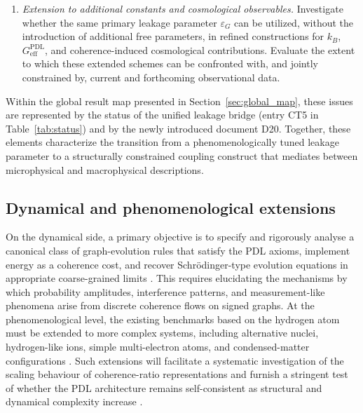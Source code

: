\documentclass[11pt,a4paper]{article}
\newcommand{\PDL}{\mathrm{PDL}}
\begin{document}
\begin{enumerate}[label=(\roman*), leftmargin=*]
  In addition, investigate whether alternative PDL-compatible architectures exist that simultaneously reproduce $G$ and $\alpha$ while violating this bridge relation, thereby systematically probing the uniqueness and structural stability of the proposed $G$--$\alpha$ correspondence.
  
  \item \emph{Extension to additional constants and cosmological observables.}  Investigate whether the same primary leakage parameter $\varepsilon_G$ can be utilized, without the introduction of additional free parameters, in refined constructions for $k_B$, $G_{\mathrm{eff}}^{\PDL}$, and coherence-induced cosmological contributions. Evaluate the extent to which these extended schemes can be confronted with, and jointly constrained by, current and forthcoming observational data.
\end{enumerate}
Within the global result map presented in Section~\ref{sec:global_map}, these issues are represented by the status of the unified leakage bridge (entry CT5 in Table~\ref{tab:status}) and by the newly introduced document D20. Together, these elements characterize the transition from a phenomenologically tuned leakage parameter to a structurally constrained coupling construct that mediates between microphysical and macrophysical descriptions.


\subsection{Dynamical and phenomenological extensions}
\label{subsec:roadmap_dynamical}

On the dynamical side, a primary objective is to specify and rigorously analyse a canonical class of graph-evolution rules that satisfy the PDL axioms, implement energy as a coherence cost, and recover Schr\"odinger-type evolution equations in appropriate coarse-grained limits \citep{Coherence_Leakage_18_2026,Coherence_Leakage_18_2026}. This requires elucidating the mechanisms by which probability amplitudes, interference patterns, and measurement-like phenomena arise from discrete coherence flows on signed graphs. At the phenomenological level, the existing benchmarks based on the hydrogen atom must be extended to more complex systems, including alternative nuclei, hydrogen-like ions, simple multi-electron atoms, and condensed-matter configurations \citep{PDL_Main_2026,Schrodinger_Sketch_v2_2026}. Such extensions will facilitate a systematic investigation of the scaling behaviour of coherence-ratio representations and furnish a stringent test of whether the PDL architecture remains self-consistent as structural and dynamical complexity increase \cite{PDL_position}.
\end{document}

